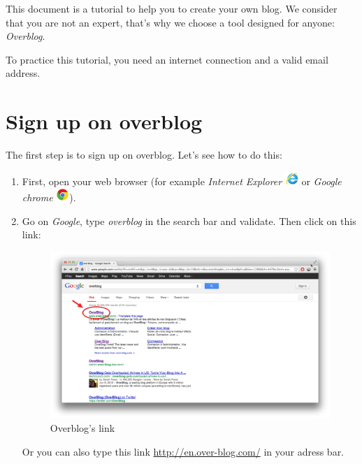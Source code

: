 \documentclass[a4paper,10pt]{article}
\begin{document}
This document is a tutorial to help you to create your own blog. We consider that you are not an expert, that's why we choose a tool designed for anyone: \emph{Overblog}.

To practice this tutorial, you need an internet connection and a valid email address.

\newpage
\section{Sign up on overblog}
The first step is to sign up on overblog. Let's see how to do this:
\begin{enumerate}
\item First, open your web browser (for example \emph{Internet Explorer} \includegraphics[width=0.5cm]{Images/explorer.png} or \emph{Google chrome} \includegraphics[width=0.5cm]{Images/chrome.png}).
\item Go on \emph{Google}, type \emph{overblog} in the search bar and validate. Then click on this link:
\begin{figure}[H]
    \center
	\includegraphics[width=13cm]{Images/linkOverblog.png}
    \caption{Overblog's link}
\end{figure}

Or you can also type this link \url{http://en.over-blog.com/} in your adress bar. 


\end{enumerate}
\end{document}
